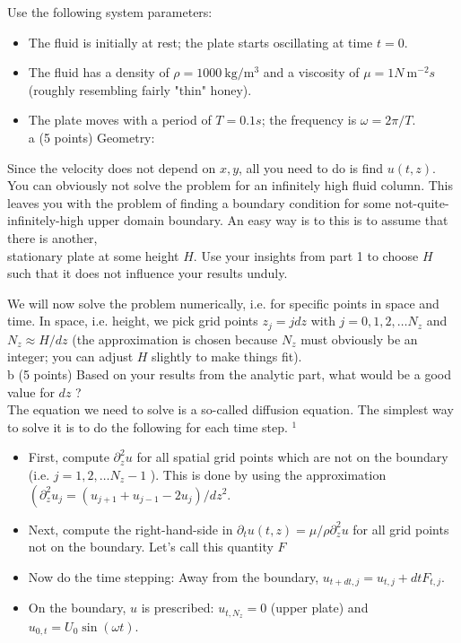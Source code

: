 \documentclass[10pt]{article}
\begin{document}
Use the following system parameters:

\begin{itemize}
  \item The fluid is initially at rest; the plate starts oscillating at time \(t=0\).
  \item The fluid has a density of \(\rho=1000 \mathrm{~kg} / \mathrm{m}^{3}\) and a viscosity of \(\mu=1 N \mathrm{~m}^{-2} s\) (roughly resembling fairly "thin" honey).
  \item The plate moves with a period of \(T=0.1 s\); the frequency is \(\omega=2 \pi / T\).\\
a (5 points) Geometry:
\end{itemize}

Since the velocity does not depend on \(x, y\), all you need to do is find \(u(t, z)\). You can obviously not solve the problem for an infinitely high fluid column. This leaves you with the problem of finding a boundary condition for some not-quite-infinitely-high upper domain boundary. An easy way is to this is to assume that there is another,\\
stationary plate at some height \(H\). Use your insights from part 1 to choose \(H\) such that it does not influence your results unduly.

We will now solve the problem numerically, i.e. for specific points in space and time. In space, i.e. height, we pick grid points \(z_{j}=j d z\) with \(j=0,1,2, \ldots N_{z}\) and \(N_{z} \approx H / d z\) (the approximation is chosen because \(N_{z}\) must obviously be an integer; you can adjust \(H\) slightly to make things fit).\\
b (5 points) Based on your results from the analytic part, what would be a good value for \(d z\) ?\\
The equation we need to solve is a so-called diffusion equation. The simplest way to solve it is to do the following for each time step. \({ }^{1}\)

\begin{itemize}
  \item First, compute \(\partial_{z}^{2} u\) for all spatial grid points which are not on the boundary (i.e. \(j=1,2, \ldots N_{z}-1\) ). This is done by using the approximation \(\left(\partial_{z}^{2} u_{j}=\left(u_{j+1}+u_{j-1}-2 u_{j}\right) / d z^{2}\right.\).
  \item Next, compute the right-hand-side in \(\partial_{t} u(t, z)=\mu / \rho \partial_{z}^{2} u\) for all grid points not on the boundary. Let's call this quantity \(F\)
  \item Now do the time stepping: Away from the boundary, \(u_{t+d t, j}=u_{t, j}+d t F_{t, j}\).
  \item On the boundary, \(u\) is prescribed: \(u_{t, N_{z}}=0\) (upper plate) and \(u_{0, t}=U_{0} \sin (\omega t)\).
\end{itemize}
\end{document}

